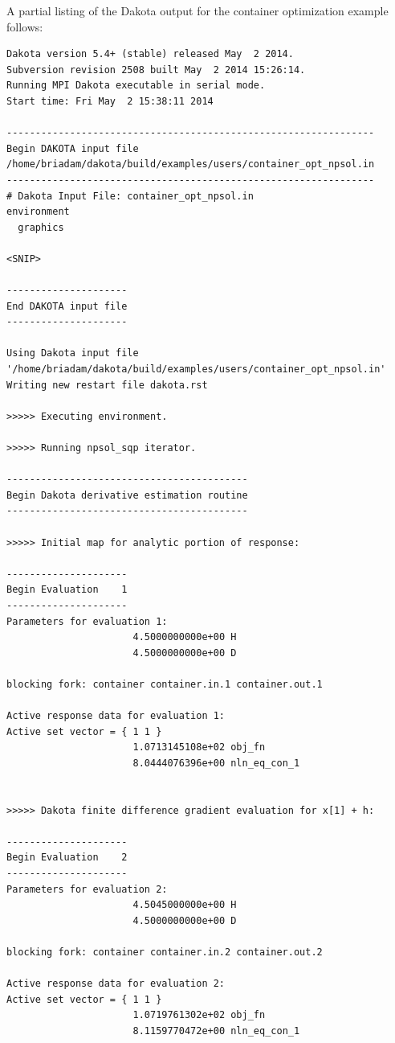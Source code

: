 \clearpage

A partial listing of the Dakota output for the container optimization
example follows:
\begin{small}
\begin{verbatim}
Dakota version 5.4+ (stable) released May  2 2014.
Subversion revision 2508 built May  2 2014 15:26:14.
Running MPI Dakota executable in serial mode.
Start time: Fri May  2 15:38:11 2014

----------------------------------------------------------------
Begin DAKOTA input file
/home/briadam/dakota/build/examples/users/container_opt_npsol.in
----------------------------------------------------------------
# Dakota Input File: container_opt_npsol.in
environment
  graphics

<SNIP>

---------------------
End DAKOTA input file
---------------------

Using Dakota input file '/home/briadam/dakota/build/examples/users/container_opt_npsol.in'
Writing new restart file dakota.rst

>>>>> Executing environment.

>>>>> Running npsol_sqp iterator.

------------------------------------------
Begin Dakota derivative estimation routine
------------------------------------------

>>>>> Initial map for analytic portion of response:

---------------------
Begin Evaluation    1
---------------------
Parameters for evaluation 1:
                      4.5000000000e+00 H
                      4.5000000000e+00 D

blocking fork: container container.in.1 container.out.1

Active response data for evaluation 1:
Active set vector = { 1 1 }
                      1.0713145108e+02 obj_fn
                      8.0444076396e+00 nln_eq_con_1


>>>>> Dakota finite difference gradient evaluation for x[1] + h:

---------------------
Begin Evaluation    2
---------------------
Parameters for evaluation 2:
                      4.5045000000e+00 H
                      4.5000000000e+00 D

blocking fork: container container.in.2 container.out.2

Active response data for evaluation 2:
Active set vector = { 1 1 }
                      1.0719761302e+02 obj_fn
                      8.1159770472e+00 nln_eq_con_1



\end{verbatim}
\end{small}
